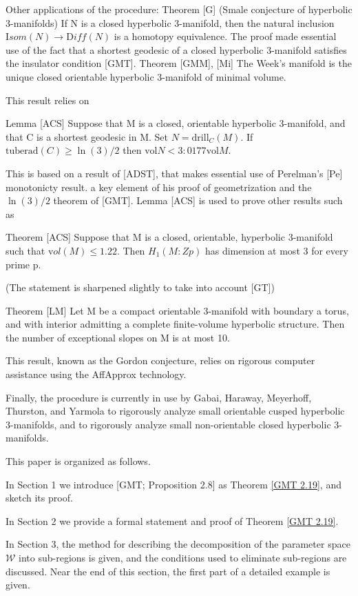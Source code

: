 Other applications of the procedure:
\vskip 8pt
Theorem [G]  (Smale conjecture of hyperbolic 3-manifolds)
If N is a closed hyperbolic 3-manifold,
then the natural inclusion ${\mathrm Isom}(N)\to {\mathrm Diff}(N)$ is a homotopy equivalence.
\vskip 8pt
The proof made essential use of the fact that a shortest geodesic
of a closed hyperbolic 3-manifold satisfies the insulator condition [GMT].
\vskip 8pt
Theorem [GMM], [Mi] The Week's manifold
is the unique closed orientable hyperbolic 3-manifold of minimal volume.

This result relies on 

Lemma [ACS] Suppose that M is a closed, orientable hyperbolic 3-manifold,
and that C is a shortest geodesic in M.
Set $N = \mathrm{drill}_C(M)$. If $\mathrm{tuberad}(C) \ge \ln(3)/2$ then
$\mathrm{vol} N < 3:0177 \mathrm{vol}M$.

This is based on a result of [ADST],
that makes essential use of Perelman's [Pe] monotonicty result.
a key element of his proof of geometrization and the $\ln(3)/2$
theorem of [GMT].
Lemma [ACS] is used to prove other results such as 

Theorem [ACS] Suppose that M is a closed, orientable, hyperbolic
3-manifold such that ${\mathrm vol}(M) \le 1.22$.
Then $H_1(M:Zp)$ has dimension at most 3 for every prime p.

(The statement is sharpened slightly to take into account [GT])

Theorem [LM] Let M be a compact orientable 3-manifold with boundary a torus,
and with interior admitting a complete finite-volume hyperbolic structure.
Then the number of exceptional slopes on M is at most 10.

This result, known as the Gordon conjecture,
relies on rigorous computer assistance using the AffApprox technology.

Finally, the procedure is currently in use
by Gabai, Haraway, Meyerhoff, Thurston, and Yarmola
to rigorously analyze small orientable cusped hyperbolic $3$-manifolds,
and to rigorously analyze small non-orientable closed hyperbolic $3$-manifolds.


This paper is organized as follows.

In Section 1 we introduce [GMT; Proposition 2.8] as Theorem \ref{GMT 2.19},
and sketch its proof.

In Section 2 we provide a formal statement and proof of Theorem \ref{GMT 2.19}.

In Section 3,
the method for describing the decomposition
of the parameter space ${\mathcal W}$ into sub-regions is given,
and the conditions used to eliminate sub-regions are discussed.
Near the end of this section, the first part of a detailed example is given.

